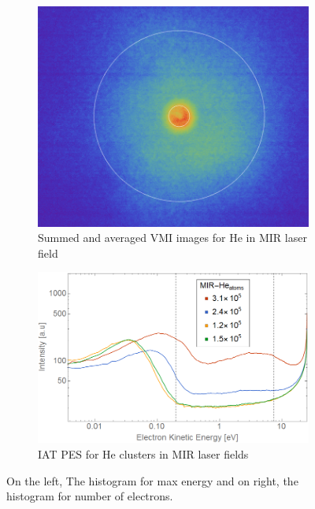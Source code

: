 \begin{figure}[h!]
\centering
\begin{subfigure}[l]{0.4\textwidth}\caption{Summed and averaged VMI images for He in MIR laser field}
\includegraphics[width=1\textwidth]{../Images/results/Comparison_energyDistribution/MIr_He_10K5.png} 
\end{subfigure}
\begin{subfigure}[l]{0.59\textwidth}\caption{IAT PES for He clusters in MIR laser fields}
\includegraphics[width=1\textwidth]{../Images/results/Comparison_energyDistribution/MIR_He_summed_energydist.png} 
\end{subfigure}

\caption[MIR He droplet scan histograms]{On the left, The histogram for max energy and on right, the histogram for number of electrons.}
\label{fig:MIRHeenergdist}
\end{figure}

